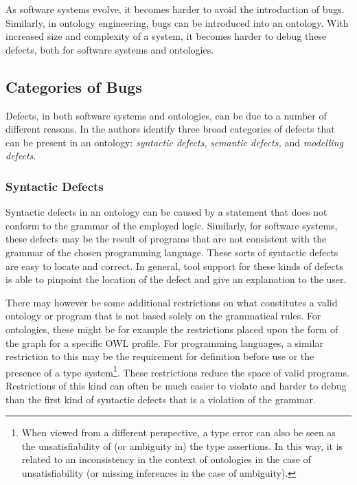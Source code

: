 
As software systems evolve, it becomes harder to avoid the introduction of bugs. Similarly, in ontology engineering, bugs can be introduced into an ontology. With increased size and complexity of a system, it becomes harder to debug these defects, both for software systems and ontologies.

\subsection{Categories of Bugs} \label{categories-of-bugs}

Defects, in both software systems and ontologies, can be due to a number of different reasons. In \cite{kalyanpur2005debugging} the authors identify three broad categories of defects that can be present in an ontology: \emph{syntactic defects}, \emph{semantic defects,} and \emph{modelling defects}.

\subsubsection{Syntactic Defects} \label{syntactic-defects}

Syntactic defects in an ontology can be caused by a statement that does not conform to the grammar of the employed logic. Similarly, for software systems, these defects may be the result of programs that are not consistent with the grammar of the chosen programming language. These sorts of syntactic defects are easy to locate and correct. In general, tool support for these kinds of defects is able to pinpoint the location of the defect and give an explanation to the user.

\begin{example}
\end{example}

There may however be some additional restrictions on what constitutes a valid ontology or program that is not based solely on the grammatical rules. For ontologies, these might be for example the restrictions placed upon the form of the graph for a specific OWL profile. For programming languages, a similar restriction to this may be the requirement for definition before use or the presence of a type system\footnote{When viewed from a different perspective, a type error can also be seen as the unsatisfiability of (or ambiguity in) the type assertions. In this way, it is related to an inconsistency in the context of ontologies in the case of unsatisfiability (or missing inferences in the case of ambiguity).}. These restrictions reduce the space of valid programs. Restrictions of this kind can often be much easier to violate and harder to debug than the first kind of syntactic defects that is a violation of the grammar.

